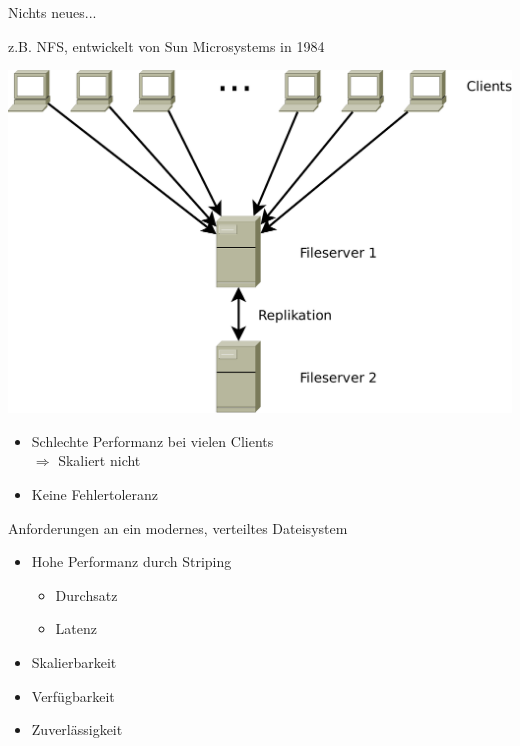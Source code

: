 \documentclass[notes=hide,yellow]{beamer}
\begin{document}
\begin{frame}{Nichts neues...}

		z.B. NFS, entwickelt von Sun Microsystems in 1984
		\begin{center}
			\includegraphics[scale=0.2]{nfs.pdf}
		\end{center}
		\begin{itemize}
			\item Schlechte Performanz bei vielen Clients \\ $\Rightarrow$ Skaliert nicht
			\item Keine Fehlertoleranz
		\end{itemize}
\end{frame}



\begin{frame}{Anforderungen an ein modernes, verteiltes Dateisystem}
	\begin{itemize}
		\item Hohe Performanz durch Striping
			\begin{itemize}
				\item Durchsatz
				\item Latenz
			\end{itemize}
		\item Skalierbarkeit
		\item Verf\"ugbarkeit
		\item Zuverl\"assigkeit
	\end{itemize}
\end{frame}
\end{document}
